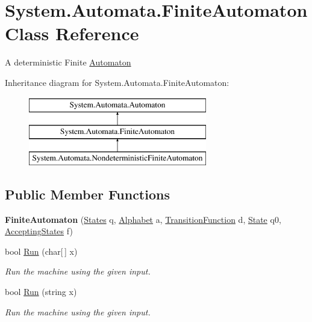 \hypertarget{class_system_1_1_automata_1_1_finite_automaton}{}\section{System.\+Automata.\+Finite\+Automaton Class Reference}
\label{class_system_1_1_automata_1_1_finite_automaton}


A deterministic Finite \mbox{\hyperlink{class_system_1_1_automata_1_1_automaton}{Automaton}}  


Inheritance diagram for System.\+Automata.\+Finite\+Automaton\+:\begin{figure}[H]
\begin{center}
\leavevmode
\includegraphics[height=3.000000cm]{class_system_1_1_automata_1_1_finite_automaton}
\end{center}
\end{figure}
\subsection*{Public Member Functions}
\begin{DoxyCompactItemize}
\item 
\mbox{\label{class_system_1_1_automata_1_1_finite_automaton_a6ac4737d865c3df8657ed1814b47905d}} 
{\bfseries Finite\+Automaton} (\mbox{\hyperlink{class_system_1_1_automata_1_1_states}{States}} q, \mbox{\hyperlink{class_system_1_1_automata_1_1_alphabet}{Alphabet}} a, \mbox{\hyperlink{class_system_1_1_automata_1_1_transition_function}{Transition\+Function}} d, \mbox{\hyperlink{class_system_1_1_automata_1_1_state}{State}} q0, \mbox{\hyperlink{class_system_1_1_automata_1_1_accepting_states}{Accepting\+States}} f)
\item 
bool \mbox{\hyperlink{class_system_1_1_automata_1_1_finite_automaton_a8c6c352f912d13d5a0047583a34247db}{Run}} (char\mbox{[}$\,$\mbox{]} x)
\begin{DoxyCompactList}\small\item\em Run the machine using the given input. \end{DoxyCompactList}\item 
bool \mbox{\hyperlink{class_system_1_1_automata_1_1_finite_automaton_aaa76a2104f685809c00c7adc8ceb240f}{Run}} (string x)
\begin{DoxyCompactList}\small\item\em Run the machine using the given input. \end{DoxyCompactList}\end{DoxyCompactItemize}
